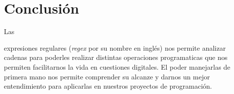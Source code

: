 \documentclass[stu, 12pt, letterpaper, donotrepeattitle, floatsintext, natbib]{apa7}
\begin{document}
\section{Conclusión}
Las \begin{justifying}
    expresiones regulares (\emph{regex} por su nombre en inglés) nos permite analizar
    cadenas para poderles realizar distintas operaciones programaticas que nos permiten
    facilitarnos la vida en cuestiones digitales. El poder manejarlas de primera mano
    nos permite comprender su alcanze y darnos un mejor entendimiento para aplicarlas en nuestros
    proyectos de programación.\par   
    \end{justifying}
\end{document}
